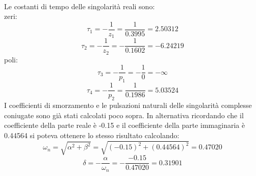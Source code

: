 \\
Le costanti di tempo delle singolarità reali sono: \\
zeri: \\
$$\tau_{1}=-\frac{1}{z_{1}}=\frac{1}{0.3995}=2.50312$$
$$\tau_{2}=-\frac{1}{z_{2}}=-\frac{1}{0.1602}=-6.24219$$ 
poli: \\
$$\tau_{3}=-\frac{1}{p_{1}}=-\frac{1}{0}=-\infty$$ 
$$\tau_{4}=-\frac{1}{p_{2}}=\frac{1}{0.1986}=5.03524$$
I coefficienti di smorzamento e le pulsazioni naturali delle singolarità complesse coniugate sono già stati calcolati poco sopra. In alternativa ricordando che il coefficiente della parte reale è -0.15 e il coefficiente della parte immaginaria è 0.44564 si poteva ottenere lo stesso risultato calcolando: \\
$$\omega_n=\sqrt{\alpha^2+\beta^2}=\sqrt{(-0.15)^2+(0.44564)^2}=0.47020$$
$$\delta=-\frac{\alpha}{\omega_n}=-\frac{-0.15}{0.47020}=0.31901$$